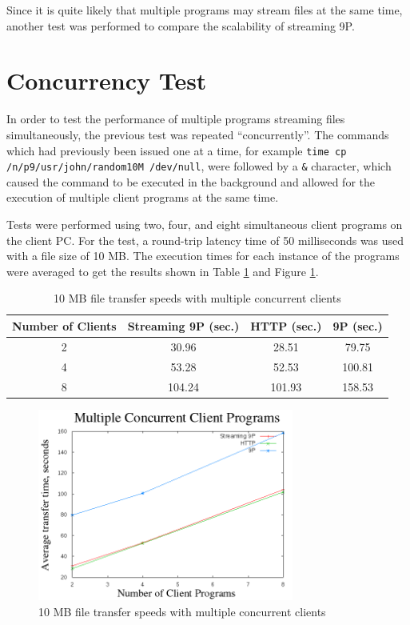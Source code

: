 \documentclass[11pt,american]{report}
\begin{document}
Since it is quite likely that multiple programs may stream files at the same time, another test was performed to compare the scalability of streaming 9P.

\section{Concurrency Test}

In order to test the performance of multiple programs streaming files simultaneously, the previous test was repeated ``concurrently''. The commands which had previously been issued one at a time, for example {\footnotesize{\tt time cp /n/p9/usr/john/random10M /dev/null}}, were followed by a {\tt \&} character, which caused the command to be executed in the background and allowed for the execution of multiple client programs at the same time.

Tests were performed using two, four, and eight simultaneous client programs on the client PC. For the test, a round-trip latency time of 50 milliseconds was used with a file size of 10 MB. The execution times for each instance of the programs were averaged to get the results shown in Table \ref{table:concurrent} and Figure \ref{figure:concurrent}.

\begin{table}[h]
	\caption{10 MB file transfer speeds with multiple concurrent clients}
	\begin{center}
		\begin{tabular}{ | c || c | c | c |}
			\hline
			\bf{Number of Clients} & \bf{Streaming 9P (sec.)} & \bf{HTTP (sec.)} & \bf{9P (sec.)} \\ \hline
			2 & 30.96 & 28.51 & 79.75 \\ \hline
			4 & 53.28 & 52.53 & 100.81 \\ \hline
			8 & 104.24 & 101.93 & 158.53 \\ \hline
		\end{tabular}
	\end{center}
	\label{table:concurrent}
\end{table}

\begin{figure}[h]
	\begin{center}
		\includegraphics[width=0.75\textwidth]{results/concurrent.png}
	\end{center}
	\caption{10 MB file transfer speeds with multiple concurrent clients}
	\label{figure:concurrent}
\end{figure}
\end{document}
